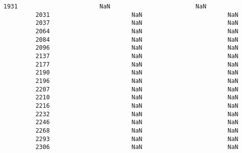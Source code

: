 \documentclass[11pt]{article}
\begin{document}
\begin{Verbatim}[commandchars=\\\{\}]
         1931                       NaN                        NaN   
         2031                       NaN                        NaN   
         2037                       NaN                        NaN   
         2064                       NaN                        NaN   
         2084                       NaN                        NaN   
         2096                       NaN                        NaN   
         2137                       NaN                        NaN   
         2177                       NaN                        NaN   
         2190                       NaN                        NaN   
         2196                       NaN                        NaN   
         2207                       NaN                        NaN   
         2210                       NaN                        NaN   
         2216                       NaN                        NaN   
         2232                       NaN                        NaN   
         2246                       NaN                        NaN   
         2268                       NaN                        NaN   
         2293                       NaN                        NaN   
         2306                       NaN                        NaN   
         

\end{Verbatim}
\end{document}
